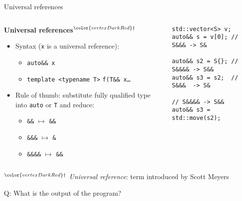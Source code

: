 \begin{frame}[fragile]{Universal references}
    \begin{columns}
        \begin{column}{.5\textwidth}
            \textbf{Universal references${}^{\color{vertexDarkRed}\dagger}$}
            \begin{itemize}
                \item Syntax (\texttt{x} is a universal reference):
                \begin{itemize}
                    \item \texttt{auto\&\& x}
                    \item \texttt{template <typename T>} \texttt{f(T\&\& x\ldots}
                \end{itemize}
                \item Rule of thumb: substitute fully qualified type into \texttt{auto} or \texttt{T} and reduce:
                \begin{itemize}
                    \item \texttt{\&\&} $\mapsto$ \texttt{\&\&} 
                    \item \texttt{\&\&\&} $\mapsto$ \texttt{\&} 
                    \item \texttt{\&\&\&\&} $\mapsto$ \texttt{\&\&} 
                \end{itemize}
            \end{itemize}
        \end{column}
        \begin{column}{.45\textwidth}
            \begin{lstlisting}[numbers=none]
std::vector<S> v;
auto&& s = v[0]; // S&&& -> S&

auto&& s2 = S{}; // S&&&& -> S&&
auto&& s3 = s2;  // S&&&  -> S&

// S&&&& -> S&&
auto&& s3 = std::move(s2);
            \end{lstlisting}
        \end{column}
    \end{columns}

    \vspace{5mm}

    \footnotesize ${}^{\color{vertexDarkRed}\dagger}$ \textit{Universal reference}: term introduced by Scott Meyers
\end{frame}

\begin{frame}[fragile]{Q: What is the output of the program?}
\end{frame}



